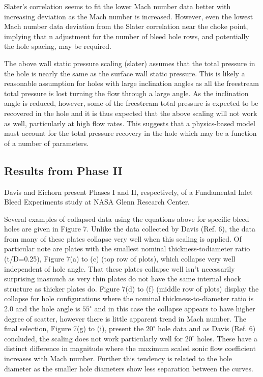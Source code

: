Slater's correlation seems to fit the lower Mach number data better with increasing deviation as the Mach number is increased. However, even the lowest Mach number data deviation from the Slater correlation near the choke point, implying that n adjustment for the number of bleed hole rows, and potentially the hole spacing, may be required.

The above wall static pressure scaling (slater) assumes that the total pressure in the hole is nearly the same as the surface wall static pressure. This is likely a reasonable assumption for holes with large inclination angles as all the freestream total pressure is lost turning the flow through a large angle. As the inclination angle is reduced, however, some of the freestream total pressure is expected to be recovered in the hole and it is thus expected that the above scaling will not work as well, particularly at high flow rates. This suggests that a physics-based model must account for the total pressure recovery in the hole which may be a function of a number of parameters.

\subsection{Results from Phase II}
Davis \cite{Davis2012} and Eichorn \cite{Eichorn2013} present Phases I and II, respectively, of a Fundamental Inlet Bleed Experiments study at NASA Glenn Research Center.

Several examples of collapsed data using the equations above for specific bleed holes are given in Figure 7. Unlike the data collected by Davis (Ref. 6), the data from many of these plates collapse very well when this scaling is applied. Of particular note are plates with the smallest nominal thickness-todiameter ratio (t/D=0.25), Figure 7(a) to (c) (top row of plots), which collapse very well independent of hole angle. That these plates collapse well isn’t necessarily surprising inasmuch as very thin plates do not have the same internal shock structure as thicker plates do. Figure 7(d) to (f) (middle row of plots) display the collapse for hole configurations where the nominal thickness-to-diameter ratio is 2.0 and the hole angle is $55^\circ$ and in this case the collapse appears to have higher degree of scatter, however there is little apparent trend in Mach number. The final selection, Figure 7(g) to (i), present the $20^\circ$ hole data and as Davis (Ref. 6) concluded, the scaling does not work particularly well for $20^\circ$ holes. These have a distinct difference in magnitude where the maximum scaled sonic flow coefficient increases with Mach number. Further this tendency is related to the hole diameter as the smaller hole diameters show less separation between the curves.


